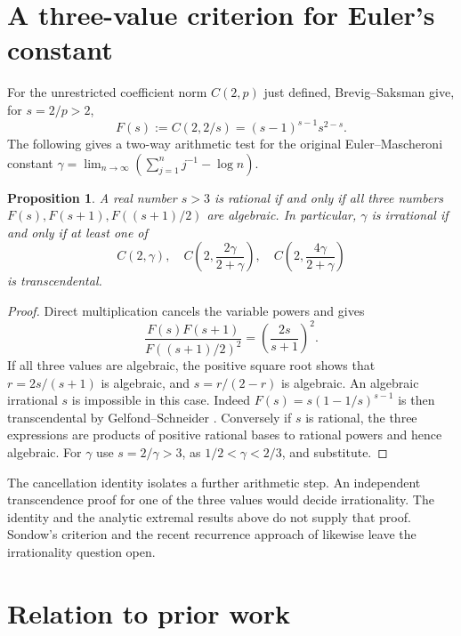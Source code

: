 \documentclass[11pt]{article}
\numberwithin{equation}{section}
\newtheorem{proposition}[theorem]{Proposition}
\theoremstyle{remark}
\begin{document}
\section{A three-value criterion for Euler's constant}

For the unrestricted coefficient norm \(C(2,p)\) just defined,
Brevig--Saksman \cite[Theorem~1]{BS} give, for \(s=2/p>2\),
\[
   F(s):=C(2,2/s)=(s-1)^{s-1}s^{2-s}.
\]
The following gives a two-way arithmetic test for the original
Euler--Mascheroni constant
\(\gamma=\lim_{n\to\infty}(\sum_{j=1}^n j^{-1}-\log n)\).

\begin{proposition}\label{prop:gamma}
A real number \(s>3\) is rational if and only if all three numbers
\(F(s),F(s+1),F((s+1)/2)\) are algebraic.
In particular, \(\gamma\) is irrational if and only if at least one of
\[
  C(2,\gamma),\quad
  C\left(2,\frac{2\gamma}{2+\gamma}\right),\quad
  C\left(2,\frac{4\gamma}{2+\gamma}\right)
\]
is transcendental.
\end{proposition}
\begin{proof}
Direct multiplication cancels the variable powers and gives
\[
  \frac{F(s)F(s+1)}{F((s+1)/2)^2}
      =\left(\frac{2s}{s+1}\right)^2.
\]
If all three values are algebraic, the positive square root shows
that \(r=2s/(s+1)\) is algebraic, and
\(s=r/(2-r)\) is algebraic. An algebraic irrational \(s\) is
impossible in this case. Indeed
\(F(s)=s(1-1/s)^{s-1}\) is then transcendental by
Gelfond--Schneider \cite{Baker}.
Conversely if \(s\) is rational, the three expressions are products
of positive rational bases to rational powers and hence algebraic.
For \(\gamma\) use \(s=2/\gamma>3\), as \(1/2<\gamma<2/3\), and substitute.
\end{proof}

The cancellation identity isolates a further arithmetic step.
An independent transcendence proof for one of the three values
would decide irrationality. The identity and the analytic extremal
results above do not supply that proof. Sondow's criterion \cite{Sondow}
and the recent recurrence approach of \cite{Kalisch} likewise
leave the irrationality question open.

\section{Relation to prior work}
\end{document}
